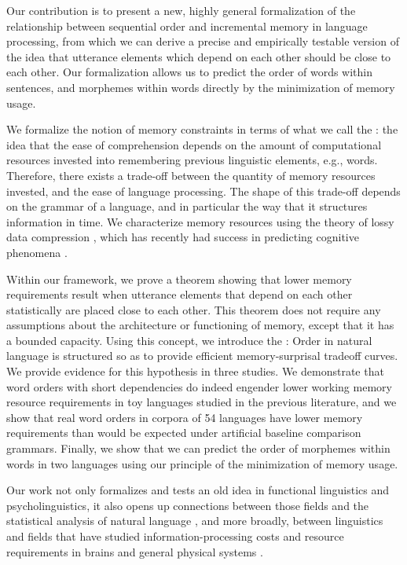 Our contribution is to present a new, highly general formalization of the relationship between sequential order and incremental memory in language processing, from which we can derive a precise and empirically testable version of the idea that utterance elements which depend on each other should be close to each other. 
Our formalization allows us to predict the order of words within sentences, and morphemes within words directly by the minimization of memory usage.

We formalize the notion of memory constraints in terms of what we call the : the idea that the ease of comprehension depends on the amount of computational resources invested into remembering previous linguistic elements, e.g., words. 
Therefore, there exists a trade-off between the quantity of memory resources invested, and the ease of language processing.
The shape of this trade-off depends on the grammar of a language, and in particular the way that it structures information in time.
We characterize memory resources using the theory of lossy data compression \citep{cover2006elements,berger2003rate}, which has recently had success in predicting cognitive phenomena \citep{sims2018efficient,zenon2019information}.%

Within our framework, we prove a theorem showing that lower memory requirements result when utterance elements that depend on each other statistically are placed close to each other. 
This theorem does not require any assumptions about the architecture or functioning of memory, except that it has a bounded capacity.
Using this concept, we introduce the : Order in natural language is structured so as to provide efficient memory-surprisal tradeoff curves.
We provide evidence for this hypothesis in three studies.
We demonstrate that word orders with short dependencies do indeed engender lower working memory resource requirements in toy languages studied in the previous literature, and we show that real word orders in corpora of 54 languages have lower memory requirements than would be expected under artificial baseline comparison grammars. 
Finally, we show that we can predict the order of morphemes within words in two languages using our principle of the minimization of memory usage.

Our work not only formalizes and tests an old idea in functional linguistics and psycholinguistics, it also opens up connections between those fields and the statistical analysis of natural language \citep{debowski-excess-2011,bentz2017word,lin-critical-2017}, and more broadly, between linguistics and fields that have studied information-processing costs and resource requirements in brains \citep[e.g.,][]{friston2010free} and general physical systems \citep[e.g.,][]{still2012thermodynamic}. 





